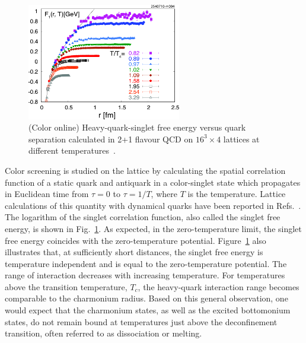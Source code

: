 \begin{figure}[h]
   \begin{center}
      \includegraphics[width=0.6\textwidth]{Figures/Fig15_LattSingEnergy.pdf}
      \caption{(Color online) Heavy-quark-singlet free energy versus quark separation 
               calculated in 2+1 flavour QCD
              on $16^3 \times 4$ lattices at different 
               temperatures~\cite{Petreczky:2009ip,Petreczky:2010yn}.  
               }
      \label{Fig:LatticeSingEner}
   \end{center}
\end{figure}
Color screening is studied on the lattice by 
calculating the spatial correlation function of a static quark and
antiquark in a color-singlet state which propagates in Euclidean time 
from $\tau=0$ to $\tau=1/T$, where $T$ is the temperature.
Lattice calculations of this quantity with dynamical quarks have been
reported in Refs.~\cite{Petreczky:2009ip,Petreczky:2010yn,Kaczmarek:2002mc}.
The logarithm of the singlet
correlation function, also called the singlet free energy,
is shown in Fig.~\ref{Fig:LatticeSingEner}. 
As expected, in the zero-temperature limit,
the singlet free energy coincides with the zero-temperature potential. 
Figure~\ref{Fig:LatticeSingEner} also illustrates that,
at sufficiently short distances, the singlet free energy is
temperature independent and is equal to the zero-temperature potential. 
The range of interaction decreases with increasing temperature.  For 
temperatures above the transition temperature, $T_c$, the heavy-quark 
interaction range becomes comparable to the charmonium radius. Based on 
this general observation, one would expect that the charmonium
states, as well as the excited bottomonium states, do not remain bound at
temperatures just above the deconfinement transition, often referred to as 
dissociation or melting. 

